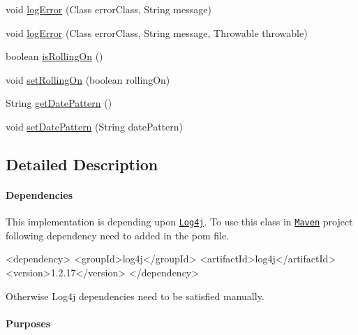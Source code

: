 \begin{DoxyCompactItemize}
\item 
void \mbox{\hyperlink{classnet_1_1dlinkddns_1_1atulsaurabh_1_1hasselfreelogger_1_1impl_1_1_hassel_free_logger_a47870e52004c823f0ef365f5d41afd6b}{log\+Error}} (Class error\+Class, String message)
\item 
void \mbox{\hyperlink{classnet_1_1dlinkddns_1_1atulsaurabh_1_1hasselfreelogger_1_1impl_1_1_hassel_free_logger_acf886c01c94bba98b551f98e2ad8ce4f}{log\+Error}} (Class error\+Class, String message, Throwable throwable)
\item 
boolean \mbox{\hyperlink{classnet_1_1dlinkddns_1_1atulsaurabh_1_1hasselfreelogger_1_1impl_1_1_hassel_free_logger_a1264dcefa68828985aa843e545ff41b6}{is\+Rolling\+On}} ()
\item 
void \mbox{\hyperlink{classnet_1_1dlinkddns_1_1atulsaurabh_1_1hasselfreelogger_1_1impl_1_1_hassel_free_logger_a9ef8b4f7c9615f50c03f168f1b949f64}{set\+Rolling\+On}} (boolean rolling\+On)
\item 
String \mbox{\hyperlink{classnet_1_1dlinkddns_1_1atulsaurabh_1_1hasselfreelogger_1_1impl_1_1_hassel_free_logger_a9b56e6059627b493e8f5ebff888795a0}{get\+Date\+Pattern}} ()
\item 
void \mbox{\hyperlink{classnet_1_1dlinkddns_1_1atulsaurabh_1_1hasselfreelogger_1_1impl_1_1_hassel_free_logger_a72529568d69eea543b2238a466cedf8d}{set\+Date\+Pattern}} (String date\+Pattern)
\end{DoxyCompactItemize}


\subsection{Detailed Description}
\paragraph*{Dependencies}

This implementation is depending upon \href{https://logging.apache.org/log4j/}{\tt Log4j}. To use this class in \href{https://maven.apache.org/}{\tt Maven} project following dependency need to added in the pom file. 
\begin{DoxyPre}

\begin{DoxyCode}
<dependency>
<groupId>log4j</groupId>
<artifactId>log4j</artifactId>
<version>1.2.17</version>
</dependency>
\end{DoxyCode}
 
 \end{DoxyPre}
 Otherwise Log4j dependencies need to be satisfied manually. \paragraph*{Purposes}

